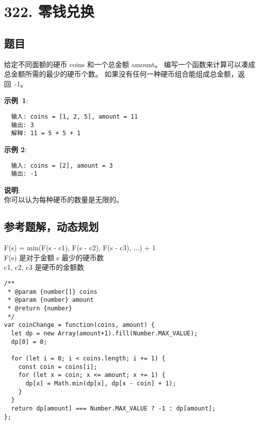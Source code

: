 \newpage
\section{322. 零钱兑换}
\label{leetcode:322}

\subsection{题目}

给定不同面额的硬币 coins 和一个总金额 amount。
编写一个函数来计算可以凑成总金额所需的最少的硬币个数。
如果没有任何一种硬币组合能组成总金额，返回 -1。

\textbf{示例 1}:

\begin{verbatim}
  输入: coins = [1, 2, 5], amount = 11
  输出: 3 
  解释: 11 = 5 + 5 + 1
\end{verbatim}

\textbf{示例 2}:

\begin{verbatim}
  输入: coins = [2], amount = 3
  输出: -1
\end{verbatim}

\textbf{说明}: \\
你可以认为每种硬币的数量是无限的。

\subsection{参考题解，动态规划}

F(s) = min(F(s - c1), F(s - c2), F(s - c3), ...) + 1 \\
F(s) 是对于金额 s 最少的硬币数 \\
c1, c2, c3 是硬币的金额数 \\

\begin{verbatim}
/**
 * @param {number[]} coins
 * @param {number} amount
 * @return {number}
 */
var coinChange = function(coins, amount) {
  let dp = new Array(amount+1).fill(Number.MAX_VALUE);
  dp[0] = 0;

  for (let i = 0; i < coins.length; i += 1) {
    const coin = coins[i];
    for (let x = coin; x <= amount; x += 1) {
      dp[x] = Math.min(dp[x], dp[x - coin] + 1);
    }
  }
  return dp[amount] === Number.MAX_VALUE ? -1 : dp[amount];
};
\end{verbatim}

